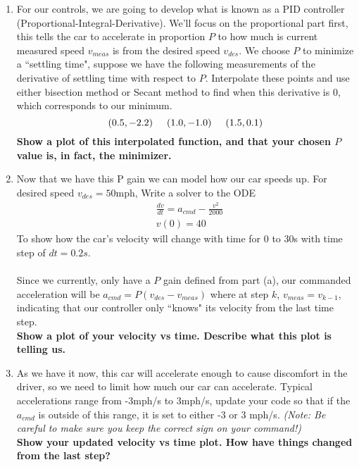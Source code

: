 \documentclass[11pt]{article}
\begin{document}
	\begin{enumerate}[label=\alph*)]
		\item For our controls, we are going to develop what is known as a PID controller (Proportional-Integral-Derivative). We'll focus on the proportional part first, this tells the car to accelerate in proportion $P$ to how much is current measured speed $v_{meas}$ is from the desired speed $v_{des}$. We choose $P$ to minimize a ``settling time", suppose we have the following measurements of the derivative of settling time with respect to $P$. Interpolate these points and use either bisection method or Secant method to find when this derivative is 0, which corresponds to our minimum. 
		\begin{equation*}
			(0.5, -2.2) \hspace{0.5cm} (1.0, -1.0) \hspace{0.5cm} (1.5, 0.1)
		\end{equation*}
		\textbf{Show a plot of this interpolated function, and that your chosen $P$ value is, in fact, the minimizer.}
		\item Now that we have this P gain we can model how our car speeds up. For desired speed $v_{des} = 50$mph, Write a solver to the ODE
		\begin{align*}
			&\frac{dv}{dt} = a_{cmd} - \frac{v^2}{2000} \\
			& v(0) = 40
		\end{align*} 
		To show how the car's velocity will change with time for 0 to 30s with time step of $dt = 0.2s$.\\
		\\
		Since we currently, only have a $P$ gain defined from part (a), our commanded acceleration will be $a_{cmd} = P(v_{des} - v_{meas})$ where at step $k$, $v_{meas} = v_{k-1}$, indicating that our controller only ``knows" its velocity from the last time step.\\
		\textbf{Show a plot of your velocity vs time. Describe what this plot is telling us.}
		\item As we have it now, this car will accelerate enough to cause discomfort in the driver, so we need to limit how much our car can accelerate. Typical accelerations range from -3mph/s to 3mph/s, update your code so that if the $a_{cmd}$ is outside of this range, it is set to either -3 or 3 mph/s. \textit{(Note: Be careful to make sure you keep the correct sign on your command!)}\\
		\textbf{Show your updated velocity vs time plot. How have things changed from the last step?}

\end{enumerate}
\end{document}
